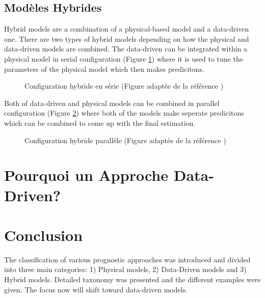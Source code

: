 \subsection{Modèles Hybrides}
Hybrid models are a combination of a physical-based model and a data-driven one.
There are two types of hybrid models depending on how the physical and data-driven models are combined.
The data-driven can be integrated within a physical model in serial configuration (Figure \ref{fig:hybrid-approach-series}) where it is used to tune the parameters of the physical model which then makes predicitons.

\begin{figure}[h]
    \centering
    
    \caption{Configuration hybride en série (Figure adaptée de la référence \cite{Mangili2013})}
    \label{fig:hybrid-approach-series}
\end{figure}

Both of data-driven and physical models can be combined in parallel configuration (Figure \ref{fig:hybrid-approach-parallel}) where both of the models make seperate predicitons which can be combined to come up with the final estimation.
\begin{figure}[h]
    \centering
    
    \caption{Configuration hybride parallèle (Figure adaptée de la référence \cite{Mangili2013})}
    \label{fig:hybrid-approach-parallel}
\end{figure}

\section{Pourquoi un Approche Data-Driven?}


\section{Conclusion}
The classification of various prognostic approaches was introduced and divided into three main categories: 1) Physical models, 2) Data-Driven models and 3) Hybrid models. Detailed taxonomy was presented and the different examples were given. The focus now will shift toward data-driven models.